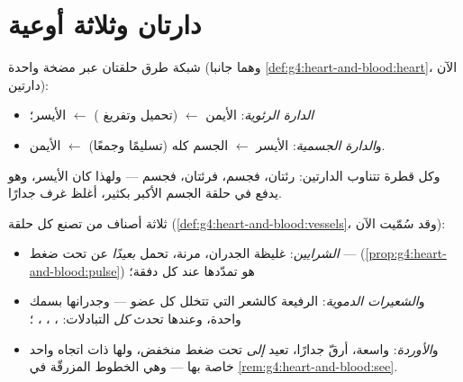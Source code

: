 \section{دارتان وثلاثة أوعية}

\begin{definition}\label{def:g7:heart-and-circulation:double}
شبكة طرق  حلقتان عبر مضخة واحدة
(وهما جانبا \cref{def:g4:heart-and-blood:heart}، الآن
دارتين):
\begin{itemize}
  \item \emph{الدارة الرئوية}:  الأيمن
        $\leftarrow$  (تحميل  وتفريغ ) $\leftarrow$  الأيسر؛
  \item و\emph{الدارة الجسمية}:  الأيسر
        $\leftarrow$ الجسم كله (تسليمًا وجمعًا)
        $\leftarrow$  الأيمن.
\end{itemize}
وكل قطرة تتناوب الدارتين: رئتان، فجسم، فرئتان، فجسم --- ولهذا كان
 الأيسر، وهو يدفع في حلقة الجسم الأكبر بكثير، أغلظ غرف 
جدارًا.
\end{definition}

\begin{definition}\label{def:g7:heart-and-circulation:vessels}
ثلاثة أصناف من  تصنع كل حلقة
(\cref{def:g4:heart-and-blood:vessels}، وقد سُمّيت الآن):
\begin{itemize}
  \item \emph{الشرايين}: غليظة الجدران، مرنة، تحمل
         \emph{بعيدًا} عن  تحت ضغط --- 
        (\cref{prop:g4:heart-and-blood:pulse}) هو تمدّدها عند كل
        دفقة؛
  \item و\emph{الشعيرات الدموية}: 
        الرفيعة كالشعر التي تتخلل كل عضو --- وجدرانها بسمك 
        واحدة، وعندها تحدث \emph{كل} التبادلات: ،
        ، ، ؛
  \item و\emph{الأوردة}: واسعة، أرقّ جدارًا، تعيد
         \emph{إلى}  تحت ضغط منخفض، ولها  ذات
        اتجاه واحد خاصة بها --- وهي الخطوط المزرقّة في
        \cref{rem:g4:heart-and-blood:see}.
\end{itemize}
\end{definition}

